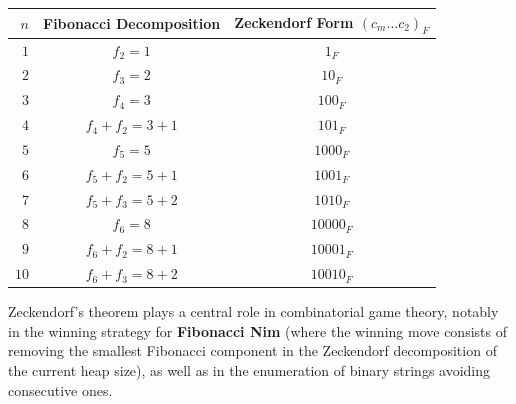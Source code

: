 \documentclass[a4paper]{article}
\begin{document}
\begin{center}
\begin{tabular}{rcc}
\toprule
$n$ & Fibonacci Decomposition & Zeckendorf Form $(c_m \dots c_2)_F$ \\
\midrule
$1$ & $f_2 = 1$ & $1_F$ \\
$2$ & $f_3 = 2$ & $10_F$ \\
$3$ & $f_4 = 3$ & $100_F$ \\
$4$ & $f_4 + f_2 = 3 + 1$ & $101_F$ \\
$5$ & $f_5 = 5$ & $1000_F$ \\
$6$ & $f_5 + f_2 = 5 + 1$ & $1001_F$ \\
$7$ & $f_5 + f_3 = 5 + 2$ & $1010_F$ \\
$8$ & $f_6 = 8$ & $10000_F$ \\
$9$ & $f_6 + f_2 = 8 + 1$ & $10001_F$ \\
$10$ & $f_6 + f_3 = 8 + 2$ & $10010_F$ \\
\bottomrule
\end{tabular}
\end{center}

Zeckendorf's theorem plays a central role in combinatorial game theory, notably in the winning strategy for \textbf{Fibonacci Nim} (where the winning move consists of removing the smallest Fibonacci component in the Zeckendorf decomposition of the current heap size), as well as in the enumeration of binary strings avoiding consecutive ones.
\end{document}
